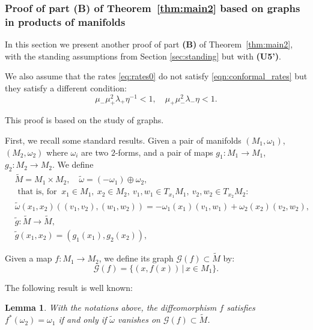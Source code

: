 \documentclass[11pt]{amsart}
\newtheorem{lem}[thm]{Lemma}
\theoremstyle{definition}
\theoremstyle{remark}
\numberwithin{equation}{section}
\newcommand{\G}{\mathcal{G}}
\begin{document}
\subsubsection{Proof of part (B) of Theorem~\ref{thm:main2} based on
  graphs in products of  manifolds
 }  \label{sec:proof_main_2_b_L}


In this section we present another proof of part {\bf(B)} of
Theorem~\ref{thm:main2}, with the  standing assumptions from Section \ref{sec:standing}
but with {\textbf{(U5')}}.

We also assume that the rates \eqref{eq:rates0} do not  satisfy \eqref{eqn:conformal_rates} but they satisfy a different condition:
\begin{equation} \label{lagrangianrates}
 \mu_-\mu_+^2 \lambda_+ \eta^{-1} < 1, \quad  \mu_+\mu_-^2\lambda_- \eta < 1 .
\end{equation}


This proof is based on the  study of graphs.


First, we recall some standard results.
Given a pair of
manifolds $(M_1, \omega_1)$, $(M_2, \omega_2)$ where $\omega_i$ are two $2$-forms,
and a pair of maps $g_1:M_1\to M_1$, $g_2:M_2\to M_2$.
We define
\begin{equation}\label{doubling}
  \begin{split}
    &\tilde M   = M_1 \times M_2 ,
\quad  \tilde \omega   = (-\omega_1) \oplus \omega_2, \\
&\textrm{ that \  is, \ for } \ x_1\in M_1, \ x_2\in M_2, \ v_1,w_1\in T_{x_1}M_1, \ v_2,w_2\in T_{x_2}M_2:
\\
    &  \tilde\omega (x_1,x_2)( (v_1,v_2), (w_1,w_2) )= -\omega_1(x_1)(v_1,w_1) + \omega_2(x_2)(v_2,w_2) ,\\
  & \tilde g : \tilde M  \rightarrow \tilde M,\\
    & \tilde g (x_1,x_2)  = (  g_1(x_1),   g_2(x_2) ),
\end{split}
\end{equation}

Given a map $f: M_1 \rightarrow M_2$, we
define its graph $\G(f) \subset \tilde M$ by:
\[
\G(f) = \{(x, f(x) )\, |\,  x \in M_1 \}.
\]


The following result is well known:

\begin{lem}\label{lem:lagrangiangraph}
  \label{lagrangiangraph}
With the notations above, the diffeomorphism  $f$ satisfies $f^*(\omega_2)=\omega_1$ if and only if $\tilde \omega$ vanishes on $\G(f) \subset \tilde{M}$.
\end{lem}
\end{document}
